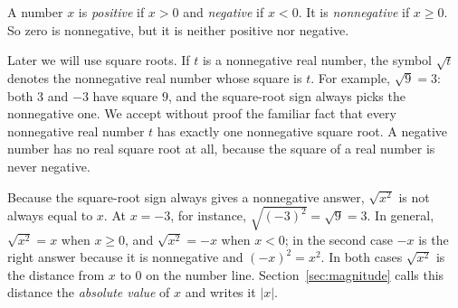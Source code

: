A number $x$ is \emph{positive} if $x>0$ and \emph{negative} if $x<0$. It is \emph{nonnegative} if $x\ge0$. So zero is nonnegative, but it is neither positive nor negative.

Later we will use square roots. If $t$ is a nonnegative real number, the symbol $\sqrt t$ denotes the nonnegative real number whose square is $t$. For example, $\sqrt9=3$: both $3$ and $-3$ have square $9$, and the square-root sign always picks the nonnegative one. We accept without proof the familiar fact that every nonnegative real number $t$ has exactly one nonnegative square root. A negative number has no real square root at all, because the square of a real number is never negative.

Because the square-root sign always gives a nonnegative answer, $\sqrt{x^2}$ is not always equal to $x$. At $x=-3$, for instance, $\sqrt{(-3)^2}=\sqrt9=3$. In general, $\sqrt{x^2}=x$ when $x\ge0$, and $\sqrt{x^2}=-x$ when $x<0$; in the second case $-x$ is the right answer because it is nonnegative and $(-x)^2=x^2$. In both cases $\sqrt{x^2}$ is the distance from $x$ to $0$ on the number line. Section~\ref{sec:magnitude} calls this distance the \emph{absolute value} of $x$ and writes it $|x|$.

